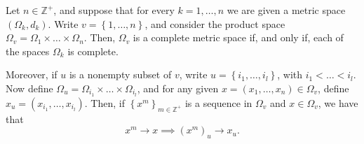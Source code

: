 \begin{lemm}\label{lemma:finite product metric}
		Let \(n\in\mathbb{Z}^{+}\), and suppose that for every \(k=1,\dots,n\) we are given a metric space \(\left(\Omega_k,d_k\right)\). Write \(v=\left\{1,\dots,n\right\}\), and consider the product space \(\Omega_v=\Omega_1\times\dots\times \Omega_n\). Then, \(\Omega_v\) is a complete metric space if, and only if, each of the spaces \(\Omega_k\) is complete.

		Moreover, if \(u\) is a nonempty subset of \(v\), write \(u=\left\{i_1,\dots,i_l\right\}\), with \(i_1<\dots<i_l\). Now define \(\Omega_u=\Omega_{i_{1}}\times \dots \times \Omega_{i_{l}}\), and for any given \(x=(x_1,\dots,x_n)\in\Omega_v\), define \(x_u=(x_{i_{1}}, \dots , x_{i_{l}})\). Then, if \(\left\{x^m\right\}_{m\in\mathbb{Z}^{+}}\) is a sequence in \(\Omega_v\) and \(x\in\Omega_v\), we have that
		\[
				x^m\to x \implies \left(x^m\right)_u\to x_u
		.\]
\end{lemm}


